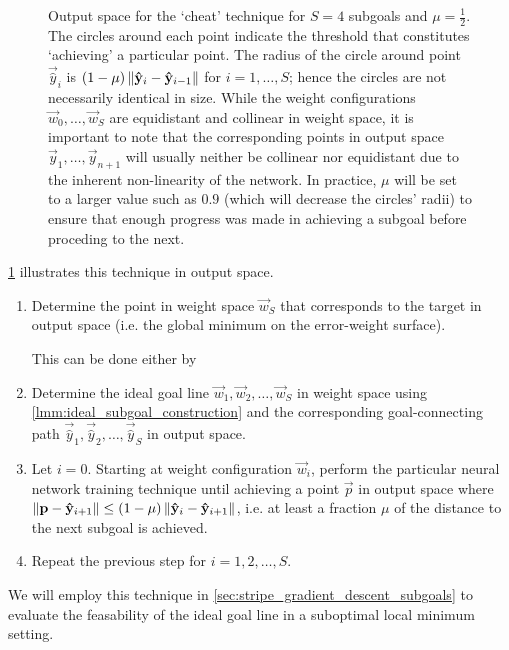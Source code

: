 \begin{figure}
    \caption{Output space for the `cheat' technique for $S=4$ subgoals and $\mu=\frac{1}{2}$. The circles around each point indicate the threshold that constitutes `achieving' a particular point. The radius of the circle around point $\vec{\hat{y}}_i$ is $(1-\mu) \left\lVert\mathbf{\hat{y}}_i-\mathbf{\hat{y}}_{i-1}\right\rVert$ for $i=1, \dots, S$; hence the circles are not necessarily identical in size. While the weight configurations $\vec{w}_0, \dots, \vec{w}_S$ are equidistant and collinear in weight space, it is important to note that the corresponding points in output space $\vec{y}_1, \dots, \vec{y}_{n+1}$ will usually neither be collinear nor equidistant due to the inherent non-linearity of the network. In practice, $\mu$ will be set to a larger value such as $0.9$ (which will decrease the circles' radii) to ensure that enough progress was made in achieving a subgoal before proceding to the next.}
    \label{fig:cheat_technique}
\end{figure}
\ref{fig:cheat_technique} illustrates this technique in output space.
\begin{enumerate}
    \item Determine the point in weight space $\vec{w}_S$ that corresponds to the target in output space (i.e. the global minimum on the error-weight surface). 
        
        This can be done either by
    
    \item Determine the ideal goal line $\vec{w}_1,\vec{w}_2,\dots,\vec{w}_S$ in weight space using \ref{lmm:ideal_subgoal_construction} and the corresponding goal-connecting path $\vec{\hat{y}}_1,\vec{\hat{y}}_2,\dots,\vec{\hat{y}}_S$ in output space.
    \item Let $i=0$. Starting at weight configuration $\vec{w}_i$, perform the particular neural network training technique until achieving a point $\vec{p}$ in output space where $\left\lVert\mathbf{p} - \mathbf{\hat{y}}_{i+1}\right\rVert \leq (1-\mu) \left\lVert\mathbf{\hat{y}}_i - \mathbf{\hat{y}}_{i+1}\right\rVert$, i.e. at least a fraction $\mu$ of the distance to the next subgoal is achieved.
    \item Repeat the previous step for $i=1, 2, \dots, S$.
\end{enumerate}
We will employ this technique in \ref{sec:stripe_gradient_descent_subgoals} to evaluate the feasability of the ideal goal line in a suboptimal local minimum setting.

